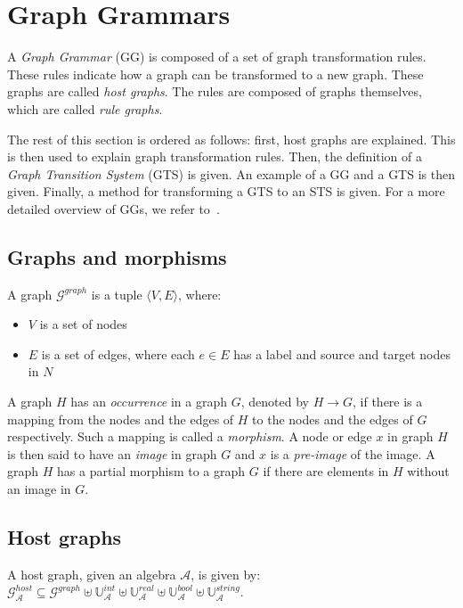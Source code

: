 \section{Graph Grammars}\label{sec:graph}
A \textit{Graph Grammar} (GG) is composed of a set of graph transformation rules. These rules indicate how a graph can be transformed to a new graph. These graphs are called \textit{host graphs}. The rules are composed of graphs themselves, which are called \textit{rule graphs}.

The rest of this section is ordered as follows: first, host graphs are explained. This is then used to explain graph transformation rules. Then, the definition of a \textit{Graph Transition System} (GTS) is given. An example of a GG and a GTS is then given. Finally, a method for transforming a GTS to an STS is given. For a more detailed overview of GGs, we refer to~\cite{Rensink:graph_grammars, Heckel2006187, Andries1999}.

\subsection{Graphs and morphisms}
A graph $\mathcal{G}^{graph}$ is a tuple $\langle V, E\rangle$, where:
\begin{itemize}
  \item $V$ is a set of nodes
  \item $E$ is a set of edges, where each $e \in E$ has a label and source and target nodes in $N$
\end{itemize}

A graph $H$ has an \textit{occurrence} in a graph $G$, denoted by $H \rightarrow G$, if there is a mapping from the nodes and the edges of $H$ to the nodes and the edges of $G$ respectively. Such a mapping is called a \textit{morphism}. A node or edge $x$ in graph $H$ is then said to have an \textit{image} in graph $G$ and $x$ is a \textit{pre-image} of the image. A graph $H$ has a partial morphism to a graph $G$ if there are elements in $H$ without an image in $G$.

\subsection{Host graphs}
A host graph, given an algebra $\mathcal{A}$, is given by: $\mathcal{G}_\mathcal{A}^{host} \subseteq \mathcal{G}^{graph} \uplus \mathbb{U}_\mathcal{A}^{int} \uplus \mathbb{U}_\mathcal{A}^{real} \uplus \mathbb{U}_\mathcal{A}^{bool} \uplus \mathbb{U}_\mathcal{A}^{string}$.

